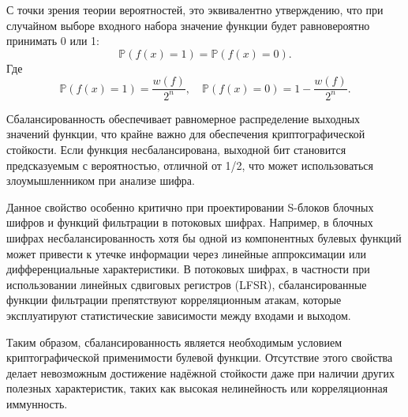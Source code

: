 С точки зрения теории вероятностей, это эквивалентно утверждению, что при случайном выборе входного набора значение функции будет равновероятно принимать 0 или 1: 
\[
\mathbb{P}(f(x) = 1) = \mathbb{P}(f(x) = 0).
\]
Где
\[
\mathbb{P}(f(x) = 1) = \frac{w(f)}{2^n}, \quad \mathbb{P}(f(x) = 0) = 1 - \frac{w(f)}{2^n}.
\]

Сбалансированность обеспечивает равномерное распределение выходных значений функции, что крайне важно для обеспечения криптографической стойкости. Если функция несбалансирована, выходной бит становится предсказуемым с вероятностью, отличной от 1/2, что может использоваться злоумышленником при анализе шифра.

Данное свойство особенно критично при проектировании S-блоков блочных шифров и функций фильтрации в потоковых шифрах. Например, в блочных шифрах несбалансированность хотя бы одной из компонентных булевых функций может привести к утечке информации через линейные аппроксимации или дифференциальные характеристики. В потоковых шифрах, в частности при использовании линейных сдвиговых регистров (LFSR), сбалансированные функции фильтрации препятствуют корреляционным атакам, которые эксплуатируют статистические зависимости между входами и выходом.

Таким образом, сбалансированность является необходимым условием криптографической применимости булевой функции. Отсутствие этого свойства делает невозможным достижение надёжной стойкости даже при наличии других полезных характеристик, таких как высокая нелинейность или корреляционная иммунность.
